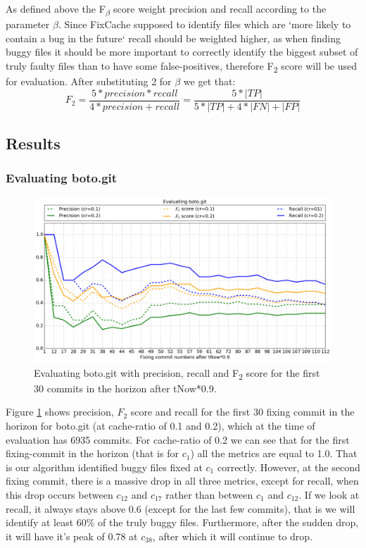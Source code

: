 \documentclass[12pt,twoside,notitlepage]{report}
\newcommand{\fxch}{FixCache}
\begin{document}
As defined above the F\textsubscript{$\beta$} score weight precision and recall according to the parameter $\beta$. Since \fxch{} supposed to identify files which are `more likely to contain a bug in the future` recall should be weighted higher, as when finding buggy files it should be more important to correctly identify the biggest subset of truly faulty files than to have some false-positives, therefore F\textsubscript{2} score will be used for evaluation. After substituting 2 for $\beta$ we get that:
\[
	F_2 = \frac{5 * precision * recall}{4 * precision + recall} = \frac{5 * |TP|}{5 * |TP| + 4 * |FN| + |FP|}
\]
\subsection{Results}
\subsubsection{Evaluating boto.git}
\begin{figure}[ht!]
\includegraphics[width=1.0\textwidth]{evaluating_boto.png}
\caption[Evaluating boto.git: recall, precision and $F_2$ score]{Evaluating boto.git with precision, recall and F\textsubscript{2} score for the first 30 commits in the horizon after tNow*0.9.}
\label{evaluating_boto}
\end{figure}
Figure \ref{evaluating_boto} shows precision, $F_2$ score and recall for the first 30 fixing commit in the horizon for boto.git (at cache-ratio of 0.1 and 0.2), which at the time of evaluation has 6935 commits. For cache-ratio of 0.2 we can see that for the first fixing-commit in the horizon (that is for $c_1$) all the metrics are equal to 1.0. That is our algorithm identified buggy files fixed at $c_1$ correctly. However, at the second fixing commit, there is a massive drop in all three metrics, except for recall, when this drop occurs between $c_{12}$ and $c_{17}$ rather than between $c_1$ and $c_{12}$. If we look at recall, it always stays above 0.6 (except for the last few commits), that is we will identify at least 60\% of the truly buggy files. Furthermore, after the sudden drop, it will have it's peak of 0.78 at $c_{38}$, after which it will continue to drop.
\end{document}
